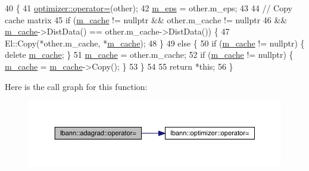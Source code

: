 \begin{DoxyCode}
40                                                 \{
41   \hyperlink{classlbann_1_1optimizer_ab7811e0a4d2d9b594140aed78b6de743}{optimizer::operator=}(other);
42   \hyperlink{classlbann_1_1adagrad_aace057f88a46dab327f6409716dbe8de}{m\_eps} = other.m\_eps;
43 
44   \textcolor{comment}{// Copy cache matrix}
45   \textcolor{keywordflow}{if} (\hyperlink{classlbann_1_1adagrad_a5eaf0d220d2be78d91455ba85eef3e9a}{m\_cache} != \textcolor{keyword}{nullptr} && other.m\_cache != \textcolor{keyword}{nullptr}
46       && \hyperlink{classlbann_1_1adagrad_a5eaf0d220d2be78d91455ba85eef3e9a}{m\_cache}->DistData() == other.m\_cache->DistData()) \{
47     El::Copy(*other.m\_cache, *\hyperlink{classlbann_1_1adagrad_a5eaf0d220d2be78d91455ba85eef3e9a}{m\_cache});
48   \}
49   \textcolor{keywordflow}{else} \{
50     \textcolor{keywordflow}{if} (\hyperlink{classlbann_1_1adagrad_a5eaf0d220d2be78d91455ba85eef3e9a}{m\_cache} != \textcolor{keyword}{nullptr}) \{ \textcolor{keyword}{delete} \hyperlink{classlbann_1_1adagrad_a5eaf0d220d2be78d91455ba85eef3e9a}{m\_cache}; \}
51     \hyperlink{classlbann_1_1adagrad_a5eaf0d220d2be78d91455ba85eef3e9a}{m\_cache} = other.m\_cache;
52     \textcolor{keywordflow}{if} (\hyperlink{classlbann_1_1adagrad_a5eaf0d220d2be78d91455ba85eef3e9a}{m\_cache} != \textcolor{keyword}{nullptr}) \{ \hyperlink{classlbann_1_1adagrad_a5eaf0d220d2be78d91455ba85eef3e9a}{m\_cache} = \hyperlink{classlbann_1_1adagrad_a5eaf0d220d2be78d91455ba85eef3e9a}{m\_cache}->Copy(); \}
53   \}
54 
55   \textcolor{keywordflow}{return} *\textcolor{keyword}{this};
56 \}
\end{DoxyCode}
Here is the call graph for this function\+:\nopagebreak
\begin{figure}[H]
\begin{center}
\leavevmode
\includegraphics[width=350pt]{classlbann_1_1adagrad_a9c9b59e0dfdfa32a3a9596a38fd95af6_cgraph}
\end{center}
\end{figure}
\mbox{\label{classlbann_1_1adagrad_a94282e58af6bb1e9af27255e23bd3d3d}} 
